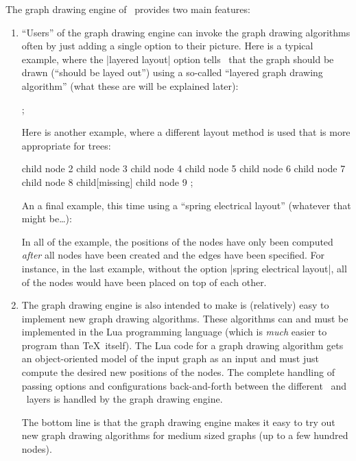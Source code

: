 The graph drawing engine of \tikzname\ provides two main features:
\begin{enumerate}
\item ``Users'' of the graph drawing engine can invoke the graph
  drawing algorithms often by just adding a single option to their
  picture. Here is a typical example, where the |layered layout| option
  tells \tikzname\ that the graph should be drawn (``should be layed
  out'') using a so-called ``layered graph drawing algorithm'' (what
  these are will be explained later):
\begin{codeexample}[]
\tikz
  ;
\end{codeexample}
  Here is another example, where a different layout method is used
  that is more appropriate for trees:
\begin{codeexample}[]
\tikz [grow'=up, binary tree layout, nodes={circle,draw}]
  child { node {2}
    child { node {3} }
    child { node {4}
      child { node {5} }
      child { node {6} }
    }
  }
  child { node {7}
    child { node {8}
      child[missing]
      child { node {9} }
    }
  };
\end{codeexample}
  An a final example, this time using a ``spring electrical layout''
  (whatever that might be\dots):
\begin{codeexample}[]
\end{codeexample}
  In all of the example, the positions of the nodes have only been
  computed \emph{after} all nodes have been created and the edges have
  been specified. For instance, in the last example, without the
  option |spring electrical layout|, all of the nodes would have been
  placed on top of each other.
\item The graph drawing engine is also intended to make is
  (relatively) easy to implement new graph drawing algorithms. These
  algorithms can and must be implemented in the Lua programming
  language (which is \emph{much} easier to program than \TeX\
  itself). The Lua code for a graph drawing algorithm gets an
  object-oriented model of the input graph as an input and must just
  compute the desired new positions of the nodes. The complete
  handling of passing options and configurations back-and-forth
  between the different \tikzname\ and \pgfname\ layers is handled by
  the graph drawing engine.

  The bottom line is that the graph drawing engine makes it easy
  to try out new graph drawing algorithms for medium sized graphs (up
  to a few hundred nodes).
\end{enumerate}

